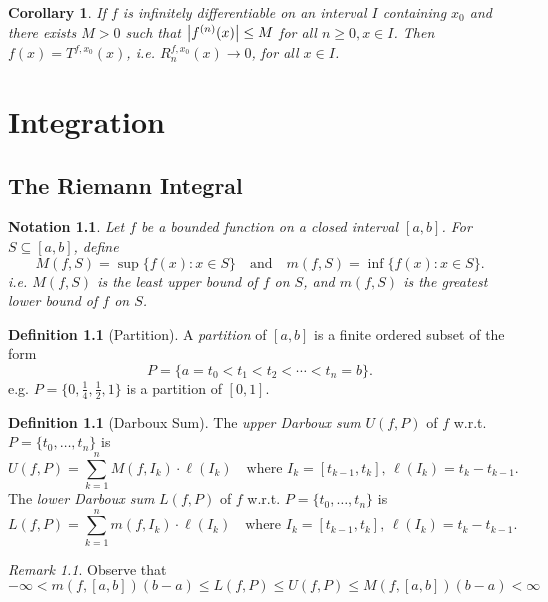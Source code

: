 \documentclass[12pt, lettersize]{book}
\theoremstyle{plain}
\newtheorem{nte}[thm]{Notation}
\newtheorem{cor}{Corollary}[thm]
\theoremstyle{definition}
\newtheorem{dfn}[thm]{Definition}
\theoremstyle{remark}
\newtheorem*{rem}{Remark}
\begin{document}
		\begin{cor}
			If $f$ is infinitely differentiable on an interval $I$ containing $x_0$ and there exists $M>0$ such that $\abs{f^{(n)}(x)}\leq M$ for all $n\geq0, x\in I$. Then $f(x)=T^{f,x_0}(x)$, i.e. $R_n^{f,x_0}(x)\rightarrow0$, for all $x\in I$.
		\end{cor}
	
	\chapter{Integration}
	\newpage
	\section{The Riemann Integral}
	\begin{nte}
		Let $f$ be a bounded function on a closed interval $[a,b]$. For $S\subseteq[a,b]$, define
		\begin{displaymath}
			M(f,S)=\sup\{f(x):x\in S\}\quad\text{and}\quad m(f,S)=\inf\{f(x):x\in S\}.
		\end{displaymath}
		i.e. $M(f,S)$ is the least upper bound of $f$ on $S$, and $m(f,S)$ is the greatest lower bound of $f$ on $S$.	
	\end{nte}
	
	\begin{dfn}[Partition]
		A \emph{partition} of $[a,b]$ is a finite ordered subset of the form
		\begin{displaymath}
			P=\{a=t_0<t_1<t_2<\cdots<t_n=b\}.
		\end{displaymath}
		e.g. $P=\{0,\frac{1}{4},\frac{1}{2},1\}$ is a partition of $[0,1]$.
	\end{dfn}
	
	\begin{dfn}[Darboux Sum]
		The \emph{upper Darboux sum} $U(f,P)$ of $f$ w.r.t. $P=\{t_0,\dots,t_n\}$ is
		\begin{displaymath}
			U(f,P)=\sum_{k=1}^{n}M(f,I_k)\cdot\ell(I_k)\quad\text{where $I_k=[t_{k-1},t_k]$,\ $\ell(I_k)=t_k-t_{k-1}$}.
		\end{displaymath}
		The \emph{lower Darboux sum} $L(f,P)$ of $f$ w.r.t. $P=\{t_0,\dots,t_n\}$ is
		\begin{displaymath}
			L(f,P)=\sum_{k=1}^{n}m(f,I_k)\cdot\ell(I_k)\quad\text{where $I_k=[t_{k-1},t_k]$,\ $\ell(I_k)=t_k-t_{k-1}$}.
		\end{displaymath}
	\end{dfn}
	\begin{rem}
		Observe that
		\begin{displaymath}
			-\infty<m(f,[a,b])(b-a)\leq L(f,P)\leq U(f,P)\leq M(f,[a,b])(b-a)<\infty
		\end{displaymath}
	\end{rem}
	
\end{document}
